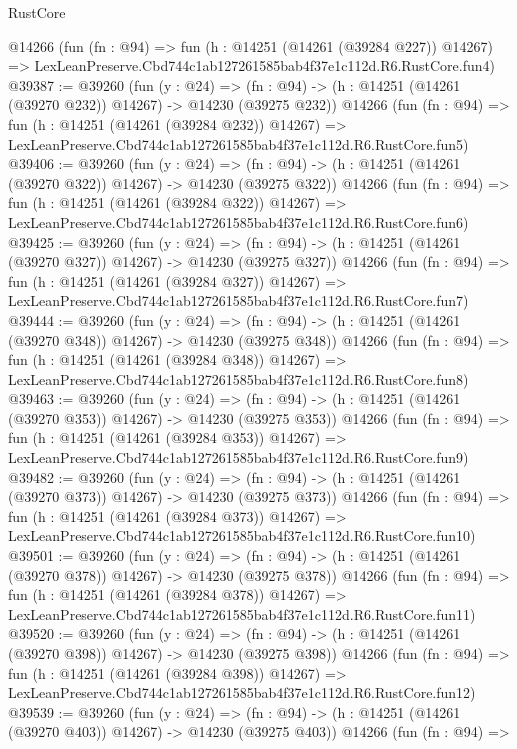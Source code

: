 \begin{lexlean}{RustCore}
\begin{coremodule}
    @14266
    (fun (fn : @94) =>
    fun (h : @14251 (@14261 (@39284 @227)) @14267) =>
    LexLeanPreserve.Cbd744c1ab127261585bab4f37e1c112d.R6.RustCore.fun4)
@39387 := @39260
    (fun (y : @24) =>
    (fn : @94) -> (h : @14251 (@14261 (@39270 @232)) @14267) -> @14230 (@39275 @232))
    @14266
    (fun (fn : @94) =>
    fun (h : @14251 (@14261 (@39284 @232)) @14267) =>
    LexLeanPreserve.Cbd744c1ab127261585bab4f37e1c112d.R6.RustCore.fun5)
@39406 := @39260
    (fun (y : @24) =>
    (fn : @94) -> (h : @14251 (@14261 (@39270 @322)) @14267) -> @14230 (@39275 @322))
    @14266
    (fun (fn : @94) =>
    fun (h : @14251 (@14261 (@39284 @322)) @14267) =>
    LexLeanPreserve.Cbd744c1ab127261585bab4f37e1c112d.R6.RustCore.fun6)
@39425 := @39260
    (fun (y : @24) =>
    (fn : @94) -> (h : @14251 (@14261 (@39270 @327)) @14267) -> @14230 (@39275 @327))
    @14266
    (fun (fn : @94) =>
    fun (h : @14251 (@14261 (@39284 @327)) @14267) =>
    LexLeanPreserve.Cbd744c1ab127261585bab4f37e1c112d.R6.RustCore.fun7)
@39444 := @39260
    (fun (y : @24) =>
    (fn : @94) -> (h : @14251 (@14261 (@39270 @348)) @14267) -> @14230 (@39275 @348))
    @14266
    (fun (fn : @94) =>
    fun (h : @14251 (@14261 (@39284 @348)) @14267) =>
    LexLeanPreserve.Cbd744c1ab127261585bab4f37e1c112d.R6.RustCore.fun8)
@39463 := @39260
    (fun (y : @24) =>
    (fn : @94) -> (h : @14251 (@14261 (@39270 @353)) @14267) -> @14230 (@39275 @353))
    @14266
    (fun (fn : @94) =>
    fun (h : @14251 (@14261 (@39284 @353)) @14267) =>
    LexLeanPreserve.Cbd744c1ab127261585bab4f37e1c112d.R6.RustCore.fun9)
@39482 := @39260
    (fun (y : @24) =>
    (fn : @94) -> (h : @14251 (@14261 (@39270 @373)) @14267) -> @14230 (@39275 @373))
    @14266
    (fun (fn : @94) =>
    fun (h : @14251 (@14261 (@39284 @373)) @14267) =>
    LexLeanPreserve.Cbd744c1ab127261585bab4f37e1c112d.R6.RustCore.fun10)
@39501 := @39260
    (fun (y : @24) =>
    (fn : @94) -> (h : @14251 (@14261 (@39270 @378)) @14267) -> @14230 (@39275 @378))
    @14266
    (fun (fn : @94) =>
    fun (h : @14251 (@14261 (@39284 @378)) @14267) =>
    LexLeanPreserve.Cbd744c1ab127261585bab4f37e1c112d.R6.RustCore.fun11)
@39520 := @39260
    (fun (y : @24) =>
    (fn : @94) -> (h : @14251 (@14261 (@39270 @398)) @14267) -> @14230 (@39275 @398))
    @14266
    (fun (fn : @94) =>
    fun (h : @14251 (@14261 (@39284 @398)) @14267) =>
    LexLeanPreserve.Cbd744c1ab127261585bab4f37e1c112d.R6.RustCore.fun12)
@39539 := @39260
    (fun (y : @24) =>
    (fn : @94) -> (h : @14251 (@14261 (@39270 @403)) @14267) -> @14230 (@39275 @403))
    @14266
    (fun (fn : @94) =>

\end{coremodule}
\end{lexlean}
